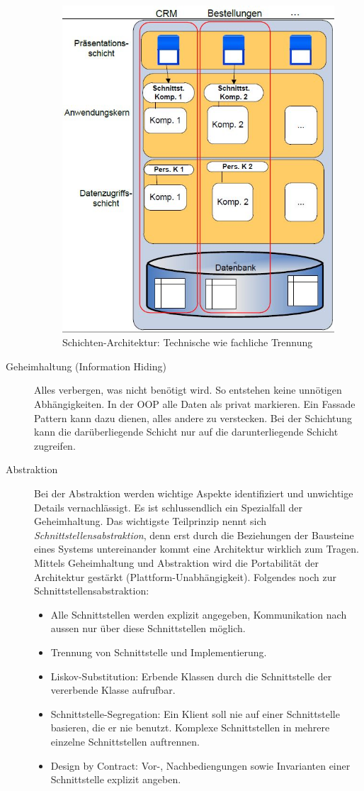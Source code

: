 \begin{description}
	\begin{figure}[h!]
	\centering
	\includegraphics[width=0.6\linewidth]{fig/schichten-architektur}
	\caption{Schichten-Architektur: Technische wie fachliche Trennung}
	\label{fig:schichten-architektur}
	\end{figure}

	\item[Geheimhaltung (Information Hiding)] Alles verbergen, was nicht benötigt wird. So entstehen keine unnötigen Abhängigkeiten. In der OOP alle Daten als privat markieren. Ein Fassade Pattern kann dazu dienen, alles andere zu verstecken. Bei der Schichtung kann die darüberliegende Schicht nur auf die darunterliegende Schicht zugreifen.
	
	\item[Abstraktion] Bei der Abstraktion werden wichtige Aspekte identifiziert und unwichtige Details vernachlässigt. Es ist schlussendlich ein Spezialfall der Geheimhaltung. Das wichtigste Teilprinzip nennt sich \emph{Schnittstellensabstraktion}, denn erst durch die Beziehungen der Bausteine eines Systems untereinander kommt eine Architektur wirklich zum Tragen. Mittels Geheimhaltung und Abstraktion wird die Portabilität der Architektur gestärkt (Plattform-Unabhängigkeit). Folgendes noch zur Schnittstellensabstraktion:
	
	\begin{itemize}
		\item Alle Schnittstellen werden explizit angegeben, Kommunikation nach aussen nur über diese Schnittstellen möglich.
		\item Trennung von Schnittstelle und Implementierung.
		\item Liskov-Substitution: Erbende Klassen durch die Schnittstelle der vererbende Klasse aufrufbar.
		\item Schnittstelle-Segregation: Ein Klient soll nie auf einer Schnittstelle basieren, die er nie benutzt. Komplexe Schnittstellen in mehrere einzelne Schnittstellen auftrennen.
		\item Design by Contract: Vor-, Nachbediengungen sowie Invarianten einer Schnittstelle explizit angeben.
	\end{itemize}
		

\end{description}
